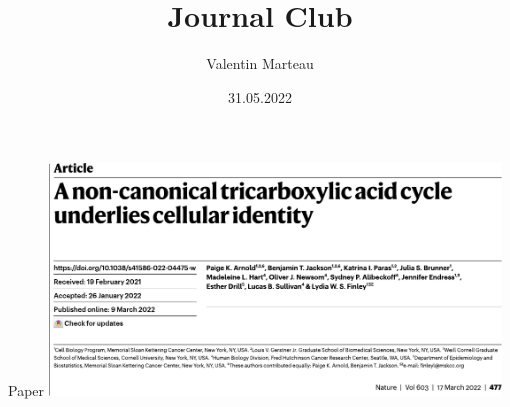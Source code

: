 \documentclass[10pt, aspectratio=169]{beamer}
\title{Journal Club}
\author{Valentin Marteau}
\date{31.05.2022}
\begin{document}
{
  \begin{frame}
    \titlepage
  \end{frame}
}


\begin{frame}{Paper}
\centering
\includegraphics[width=0.9\textwidth]{figures/Arnold_2022_title.pdf}
\end{frame}
\end{document}

